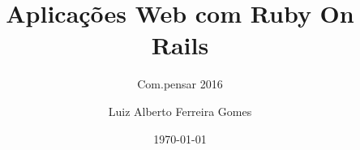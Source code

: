 \author{Luiz Alberto Ferreira Gomes}
\title{Aplicações Web com Ruby On Rails}
\subtitle{Com.pensar 2016}
\date{\today}
